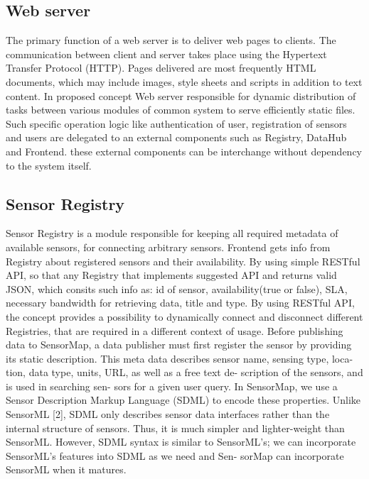 	\subsection{Web server}
  The primary function of a web server is to deliver web pages to clients. The communication between client and server takes place using the Hypertext Transfer Protocol (HTTP). Pages delivered are most frequently HTML documents, which may include images, style sheets and scripts in addition to text content. 
  \newline In proposed concept Web server responsible for dynamic distribution of tasks between various modules of common system to serve efficiently static files. Such specific operation logic like authentication of user, registration of sensors and users are delegated to an external components such as Registry, DataHub and Frontend. these external components can be interchange without dependency to the system itself.

	\subsection{Sensor Registry}
  Sensor Registry is a module responsible for keeping all required metadata of available sensors, for connecting arbitrary sensors. Frontend gets info from Registry about registered sensors and their availability. By using simple RESTful API, so that any Registry that implements suggested API and returns valid JSON, which consits such info as: id of sensor, availability(true or false), SLA, necessary bandwidth for retrieving data, title and type. By using RESTful API, the concept provides a possibility to dynamically connect and disconnect different Registries, that are required in a different context of usage. 
  Before publishing data to SensorMap, a data publisher must first register the sensor by providing its static description. This meta data describes sensor name, sensing type, loca- tion, data type, units, URL, as well as a free text de- scription of the sensors, and is used in searching sen- sors for a given user query. In SensorMap, we use a Sensor Description Markup Language (SDML) to encode these properties. Unlike SensorML [2], SDML only describes sensor data interfaces rather than the internal structure of sensors. Thus, it is much simpler and lighter-weight than SensorML. However, SDML syntax is similar to SensorML’s; we can incorporate SensorML’s features into SDML as we need and Sen- sorMap can incorporate SensorML when it matures.

